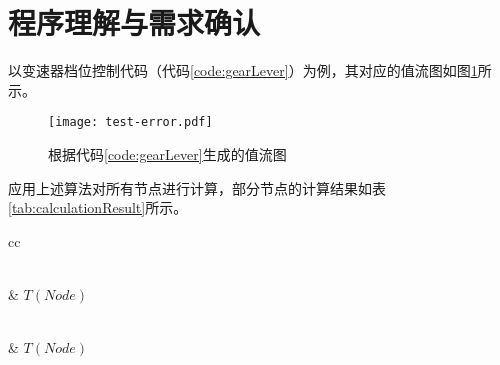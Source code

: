 \section{程序理解与需求确认}
以变速器档位控制代码（代码\ref{code:gearLever}）为例，其对应的值流图如图\ref{fig:test-error}所示。

\begin{figure}[H]
	\centering
	\texttt{[image: test-error.pdf]}
	\caption{根据代码\ref{code:gearLever}生成的值流图}
	\label{fig:test-error}
\end{figure}

应用上述算法对所有节点进行计算，部分节点的计算结果如表\ref{tab:calculationResult}所示。


\begin{longtable}{cc}
	\caption{值流图上部分节点的计算结果}
	\label{tab:calculationResult}  \\ %
	
	 & {\heiti $T(Node)$}  \\
	\midrule[1pt]
	\endfirsthead
	
	\\
	 & {\heiti $T(Node)$}  \\
	\midrule[1pt]
	\endhead 
	
	\hline
	\endfoot 
	\endlastfoot
	

\end{longtable}
